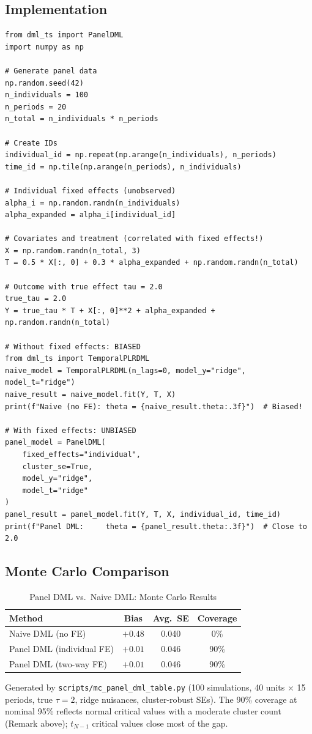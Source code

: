 \subsection{Implementation}

\begin{verbatim}
from dml_ts import PanelDML
import numpy as np

# Generate panel data
np.random.seed(42)
n_individuals = 100
n_periods = 20
n_total = n_individuals * n_periods

# Create IDs
individual_id = np.repeat(np.arange(n_individuals), n_periods)
time_id = np.tile(np.arange(n_periods), n_individuals)

# Individual fixed effects (unobserved)
alpha_i = np.random.randn(n_individuals)
alpha_expanded = alpha_i[individual_id]

# Covariates and treatment (correlated with fixed effects!)
X = np.random.randn(n_total, 3)
T = 0.5 * X[:, 0] + 0.3 * alpha_expanded + np.random.randn(n_total)

# Outcome with true effect tau = 2.0
true_tau = 2.0
Y = true_tau * T + X[:, 0]**2 + alpha_expanded + np.random.randn(n_total)

# Without fixed effects: BIASED
from dml_ts import TemporalPLRDML
naive_model = TemporalPLRDML(n_lags=0, model_y="ridge", model_t="ridge")
naive_result = naive_model.fit(Y, T, X)
print(f"Naive (no FE): theta = {naive_result.theta:.3f}")  # Biased!

# With fixed effects: UNBIASED
panel_model = PanelDML(
    fixed_effects="individual",
    cluster_se=True,
    model_y="ridge",
    model_t="ridge"
)
panel_result = panel_model.fit(Y, T, X, individual_id, time_id)
print(f"Panel DML:     theta = {panel_result.theta:.3f}")  # Close to 2.0
\end{verbatim}

\subsection{Monte Carlo Comparison}

\begin{table}[htbp]
\centering
\caption{Panel DML vs.\ Naive DML: Monte Carlo Results}
\label{tab:panel_monte_carlo}
\begin{tabular}{lccc}
\hline
\textbf{Method} & \textbf{Bias} & \textbf{Avg.\ SE} & \textbf{Coverage} \\
\hline
Naive DML (no FE) & $+0.48$ & 0.040 & 0\% \\
Panel DML (individual FE) & $+0.01$ & 0.046 & 90\% \\
Panel DML (two-way FE) & $+0.01$ & 0.046 & 90\% \\
\hline
\end{tabular}

\smallskip
\noindent\footnotesize Generated by
\texttt{scripts/mc\_panel\_dml\_table.py} (100 simulations, 40 units
$\times$ 15 periods, true $\tau = 2$, ridge nuisances, cluster-robust SEs).
The 90\% coverage at nominal 95\% reflects normal critical values with a
moderate cluster count (Remark above); $t_{N-1}$ critical values close most
of the gap.\normalsize
\end{table}

